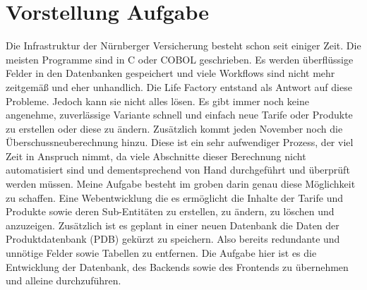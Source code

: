 \section{Vorstellung Aufgabe}
Die Infrastruktur der Nürnberger Versicherung besteht schon seit einiger Zeit. Die meisten Programme sind in C oder COBOL geschrieben.
Es werden überflüssige Felder in den Datenbanken gespeichert und viele Workflows sind nicht mehr zeitgemäß und eher unhandlich.
Die Life Factory entstand als Antwort auf diese Probleme. Jedoch kann sie nicht alles lösen.
Es gibt immer noch keine angenehme, zuverlässige Variante schnell und einfach neue Tarife oder Produkte zu erstellen oder diese zu ändern.
Zusätzlich kommt jeden November noch die Überschussneuberechnung hinzu. Diese ist ein sehr aufwendiger Prozess, der viel Zeit in Anspruch nimmt,
da viele Abschnitte dieser Berechnung nicht automatisiert sind und dementsprechend von Hand durchgeführt und überprüft werden müssen.
Meine Aufgabe besteht im groben darin genau diese Möglichkeit zu schaffen. Eine Webentwicklung die es ermöglicht die Inhalte der Tarife und Produkte sowie deren Sub-Entitäten
zu erstellen, zu ändern, zu löschen und anzuzeigen. Zusätzlich ist es geplant in einer neuen Datenbank die Daten der Produktdatenbank (PDB) gekürzt zu speichern.
Also bereits redundante und unnötige Felder sowie Tabellen zu entfernen. Die Aufgabe hier ist es die Entwicklung der Datenbank, des Backends sowie des Frontends zu übernehmen und alleine durchzuführen.
